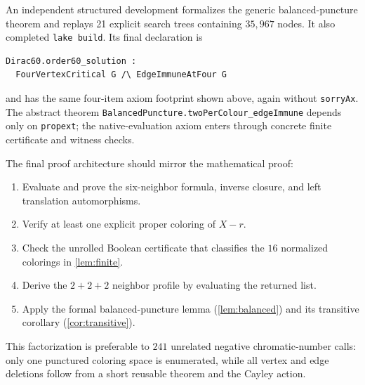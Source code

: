 \documentclass[10pt]{amsart}
\theoremstyle{definition}
\begin{document}
An independent structured development formalizes the generic
balanced-puncture theorem and replays 21 explicit search trees containing
$35{,}967$ nodes. It also completed \texttt{lake build}. Its final declaration
is
\begin{lstlisting}[language={}]
Dirac60.order60_solution :
  FourVertexCritical G /\ EdgeImmuneAtFour G
\end{lstlisting}
and has the same four-item axiom footprint shown above, again without
\texttt{sorryAx}. The abstract theorem
\texttt{BalancedPuncture.twoPerColour\_edgeImmune} depends only on
\texttt{propext}; the native-evaluation axiom enters through concrete finite
certificate and witness checks.

The final proof architecture should mirror the mathematical proof:
\begin{enumerate}[label=\textbf{L\arabic*.},leftmargin=*]
\item Evaluate and prove the six-neighbor formula, inverse closure, and left
      translation automorphisms.
\item Verify at least one explicit proper coloring of $X-r$.
\item Check the unrolled Boolean certificate that classifies the $16$
      normalized colorings in \cref{lem:finite}.
\item Derive the $2+2+2$ neighbor profile by evaluating the returned list.
\item Apply the formal balanced-puncture lemma (\cref{lem:balanced}) and its
      transitive corollary (\cref{cor:transitive}).
\end{enumerate}

This factorization is preferable to $241$ unrelated negative
chromatic-number calls:
only one punctured coloring space is enumerated, while all vertex and edge
deletions follow from a short reusable theorem and the Cayley action.
\end{document}
